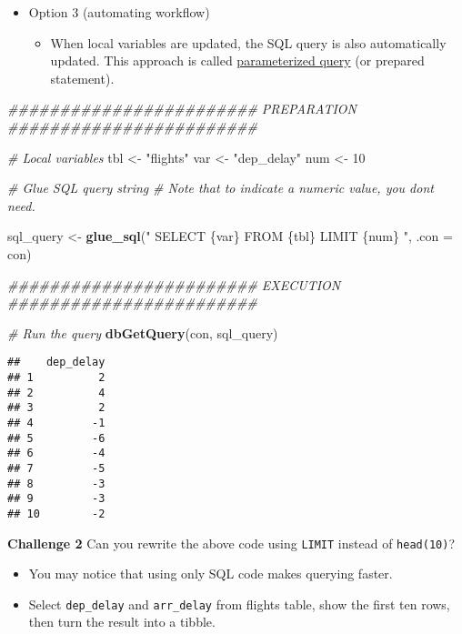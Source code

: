 \documentclass[
]{book}
\newenvironment{Shaded}{\begin{snugshade}}{\end{snugshade}}
\newcommand{\CommentTok}[1]{\textcolor[rgb]{0.56,0.35,0.01}{\textit{#1}}}
\newcommand{\DataTypeTok}[1]{\textcolor[rgb]{0.13,0.29,0.53}{#1}}
\newcommand{\DecValTok}[1]{\textcolor[rgb]{0.00,0.00,0.81}{#1}}
\newcommand{\KeywordTok}[1]{\textcolor[rgb]{0.13,0.29,0.53}{\textbf{#1}}}
\newcommand{\NormalTok}[1]{#1}
\newcommand{\StringTok}[1]{\textcolor[rgb]{0.31,0.60,0.02}{#1}}
\providecommand{\tightlist}{%
  \setlength{\itemsep}{0pt}\setlength{\parskip}{0pt}}
\begin{document}
\begin{itemize}
\item
  Option 3 (automating workflow)

  \begin{itemize}
  \tightlist
  \item
    When local variables are updated, the SQL query is also automatically updated. This approach is called \href{https://www.php.net/manual/en/pdo.prepared-statements.php}{parameterized query} (or prepared statement).
  \end{itemize}
\end{itemize}

\begin{Shaded}
\begin{Highlighting}[]
\CommentTok{\#\#\#\#\#\#\#\#\#\#\#\#\#\#\#\#\#\#\#\#\#\#\#\# PREPARATION \#\#\#\#\#\#\#\#\#\#\#\#\#\#\#\#\#\#\#\#\#\#\#\#}

\CommentTok{\# Local variables }
\NormalTok{tbl \textless{}{-}}\StringTok{ "flights"}
\NormalTok{var \textless{}{-}}\StringTok{ "dep\_delay"}
\NormalTok{num \textless{}{-}}\StringTok{ }\DecValTok{10}

\CommentTok{\# Glue SQL query string }
\CommentTok{\# Note that to indicate a numeric value, you don\textquotesingle{}t need.}

\NormalTok{sql\_query \textless{}{-}}\StringTok{ }\KeywordTok{glue\_sql}\NormalTok{(}\StringTok{"}
\StringTok{  SELECT \{\textasciigrave{}var\textasciigrave{}\}}
\StringTok{  FROM \{\textasciigrave{}tbl\textasciigrave{}\}}
\StringTok{  LIMIT \{num\} }
\StringTok{  "}\NormalTok{, }\DataTypeTok{.con =}\NormalTok{ con)}

\CommentTok{\#\#\#\#\#\#\#\#\#\#\#\#\#\#\#\#\#\#\#\#\#\#\#\# EXECUTION \#\#\#\#\#\#\#\#\#\#\#\#\#\#\#\#\#\#\#\#\#\#\#\#}

\CommentTok{\# Run the query }
\KeywordTok{dbGetQuery}\NormalTok{(con, sql\_query)}
\end{Highlighting}
\end{Shaded}

\begin{verbatim}
##    dep_delay
## 1          2
## 2          4
## 3          2
## 4         -1
## 5         -6
## 6         -4
## 7         -5
## 8         -3
## 9         -3
## 10        -2
\end{verbatim}

\textbf{Challenge 2}
Can you rewrite the above code using \texttt{LIMIT} instead of \texttt{head(10)}?

\begin{itemize}
\item
  You may notice that using only SQL code makes querying faster.
\item
  Select \texttt{dep\_delay} and \texttt{arr\_delay} from flights table, show the first ten rows, then turn the result into a tibble.
\end{itemize}
\end{document}
